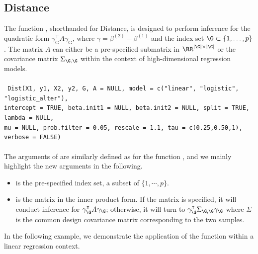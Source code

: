 \subsection{Distance}
\label{subsec: Dist}
The function , shorthanded for Distance, is designed to perform inference for the quadratic form $\gamma_{\textrm{G}}^{\intercal}A\gamma_{\textrm{G}}$, where $\gamma = \beta^{(2)}-\beta^{(1)}$ and the index set $\G\subset \{1,\ldots, p\}$. The matrix $A$ can either be a pre-specified submatrix in $\RR^{|\G|\times |\G|}$ or the covariance matrix $\Sigma_{\G,\G}$ within the context of high-dimensional regression models.
\\
\\
\texttt{
Dist(X1, y1, X2, y2, G, A = NULL, model = c("linear", "logistic", "logistic\_alter"), \\
\indent intercept = TRUE, beta.init1 = NULL, beta.init2 = NULL, split = TRUE, lambda = NULL, \\
\indent mu = NULL, prob.filter = 0.05, rescale = 1.1, tau = c(0.25,0.50,1), verbose = FALSE)
}\\
\\
The arguments of  are similarly defined as for the function , and we mainly highlight the new arguments in the following. %
\begin{itemize}

    \item {} is the pre-specified index set, a subset of $\{1,\cdots,p\}.$

    \item {} is the matrix in the inner product form. If the matrix  is specified, it will conduct inference for $\gamma_\G^{\intercal}A\gamma_\G$; otherwise, it will turn to $\gamma_\G^{\intercal}\Sigma_{\G,\G}\gamma_\G$ where $\Sigma$ is the common design covariance matrix corresponding to the two samples.
\end{itemize}
\noindent In the following example, we demonstrate the application of the  function within a linear regression context.

